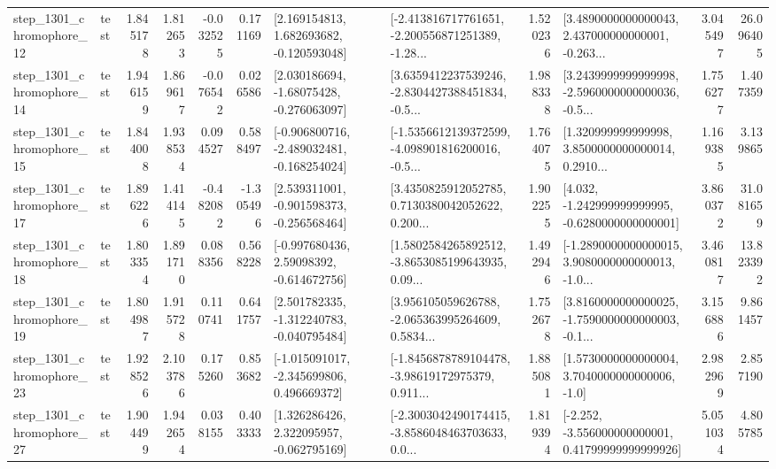 \begin{tabular}{llrrrrllrlrr}
 step\_1301\_chromophore\_12 &      test &      1.845178 &    1.812653 &     -0.032525 &  0.171169 &    [2.169154813, 1.682693682, -0.120593048] &  [-2.413816717761651, -2.200556871251389, -1.28... &       1.520236 &  [3.4890000000000043, 2.437000000000001, -0.263... &            3.045497 &         26.096405 \\
 step\_1301\_chromophore\_14 &      test &      1.946159 &    1.869617 &     -0.076542 &  0.026586 &    [2.030186694, -1.68075428, -0.276063097] &  [3.6359412237539246, -2.8304427388451834, -0.5... &       1.988338 &  [3.2439999999999998, -2.5960000000000036, -0.5... &            1.756277 &          1.407359 \\
 step\_1301\_chromophore\_15 &      test &      1.844008 &    1.938534 &      0.094527 &  0.588497 &  [-0.906800716, -2.489032481, -0.168254024] &  [-1.5356612139372599, -4.098901816200016, -0.5... &       1.764075 &  [1.320999999999998, 3.8500000000000014, 0.2910... &            1.169385 &          3.139865 \\
 step\_1301\_chromophore\_17 &      test &      1.896226 &    1.414145 &     -0.482082 & -1.305496 &   [2.539311001, -0.901598373, -0.256568464] &  [3.4350825912052785, 0.7130380042052622, 0.200... &       1.902255 &   [4.032, -1.242999999999995, -0.6280000000000001] &            3.860372 &         31.081659 \\
 step\_1301\_chromophore\_18 &      test &      1.803354 &    1.891710 &      0.088356 &  0.568228 &    [-0.997680436, 2.59098392, -0.614672756] &  [1.5802584265892512, -3.8653085199643935, 0.09... &       1.492946 &  [-1.2890000000000015, 3.9080000000000013, -1.0... &            3.460817 &         13.823392 \\
 step\_1301\_chromophore\_19 &      test &      1.804987 &    1.915728 &      0.110741 &  0.641757 &   [2.501782335, -1.312240783, -0.040795484] &  [3.956105059626788, -2.065363995264609, 0.5834... &       1.752678 &  [3.8160000000000025, -1.7590000000000003, -0.1... &            3.156886 &          9.861457 \\
 step\_1301\_chromophore\_23 &      test &      1.928526 &    2.103786 &      0.175260 &  0.853682 &   [-1.015091017, -2.345699806, 0.496669372] &  [-1.8456878789104478, -3.98619172975379, 0.911... &       1.885081 &     [1.5730000000000004, 3.7040000000000006, -1.0] &            2.982969 &          2.857190 \\
 step\_1301\_chromophore\_27 &      test &      1.904499 &    1.942654 &      0.038155 &  0.403333 &    [1.326286426, 2.322095957, -0.062795169] &  [-2.3003042490174415, -3.8586048463703633, 0.0... &       1.819394 &  [-2.252, -3.556000000000001, 0.41799999999999926] &            5.051034 &          4.805785 \\

\end{tabular}
